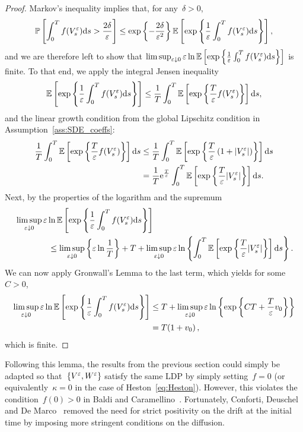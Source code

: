 \begin{proof}
Markov's inequality implies that, for any~$\delta>0$,
\[
\mathbb{P}\left[ \int_0^T f(V_s^\varepsilon)\mathrm{d} s > \frac{2\delta}{\varepsilon} \right] \leq \exp\left\{ -\frac{2\delta}{\varepsilon^2}\right\}\mathbb{E}\left[ \exp\left\{ \frac 1{\varepsilon} \int_0^T f(V_s^\varepsilon)\mathrm{d} s \right\} \right],
\]
and we are therefore left to show that 
$\limsup_{\varepsilon\downarrow 0}\varepsilon\ln\mathbb{E}\left[ \exp\left\{ \frac 1{\varepsilon} \int_0^T f(V_s^\varepsilon)\mathrm{d} s \right\} \right]$
is finite.
To that end, we apply the integral Jensen inequality
\[
\mathbb{E}\left[ \exp\left\{ \frac 1{\varepsilon} \int_0^T f(V_s^\varepsilon)\mathrm{d} s \right\} \right] \leq \frac{1}{T} \int_0^T \mathbb{E}\left[ \exp\left\{ \frac{T}{\varepsilon} f(V_s^\varepsilon) \right\} \right] \mathrm{d} s,
\]
and the linear growth condition from the global Lipschitz condition in Assumption~\ref{ass:SDE_coeffs}:
\begin{align*}
\frac{1}{T} \int_0^T \mathbb{E}\left[ \exp\left\{ \frac{T}{\varepsilon} f(V_s^\varepsilon) \right\} \right] \mathrm{d} s &\leq \frac{1}{T} \int_0^T \mathbb{E}\left[ \exp\left\{ \frac{T}{\varepsilon}\left(1 + |V_s^\varepsilon| \right) \right\} \right] \mathrm{d} s \\
&= \frac{1}{T}\mathrm{e}^{\frac{T}{\varepsilon}} \int_0^T \mathbb{E}\left[ \exp\left\{ \frac{T}{\varepsilon} |V_s^\varepsilon| \right\} \right] \mathrm{d} s.
\end{align*}
Next, by the properties of the logarithm and the supremum
\begin{align*}
& \limsup_{\varepsilon\downarrow 0}\varepsilon\ln\mathbb{E}\left[ \exp\left\{ \frac 1{\varepsilon} \int_0^T f(V_s^\varepsilon)\mathrm{d} s \right\} \right] \\ & \qquad \qquad \leq \limsup_{\varepsilon\downarrow 0}\left\{\varepsilon\ln\frac1T\right\} + T + \limsup_{\varepsilon\downarrow 0}\varepsilon\ln\left\{\int_0^T  \mathbb{E}\left[ \exp\left\{ \frac{T}{\varepsilon} |V_s^\varepsilon| \right\} \right] \mathrm{d} s\right\}.
\end{align*}
We can now apply Gronwall's Lemma to the last term, which yields for some~$C>0$,
\begin{align*}
    \limsup_{\varepsilon\downarrow 0}\varepsilon\ln\mathbb{E}\left[ \exp\left\{ \frac 1{\varepsilon} \int_0^T f(V_s^\varepsilon)\mathrm{d} s \right\} \right]
    &\leq T + \limsup_{\varepsilon\downarrow 0}\varepsilon\ln\left\{ \exp\left\{ CT + \frac{T}{\varepsilon} v_0 \right\} \right\} \\
    &= T(1+v_0)\,,
\end{align*}
which is finite.
\end{proof}
Following this lemma, the results from the previous section could simply be adapted so that~$\{V^\varepsilon, W^{\varepsilon}\}$ satisfy the same LDP by simply setting~$f=0$ (or equivalently~$\kappa = 0$ in the case of Heston~\eqref{eq:Heston}). However, this violates the condition~$f(0)>0$ in Baldi and Caramellino~\cite{Baldi2011GeneralDiffusions}. Fortunately, Conforti, Deuschel and De Marco~\cite{Conforti2015OnModels} removed the need for strict positivity on the drift at the initial time by imposing more stringent conditions on the diffusion.
